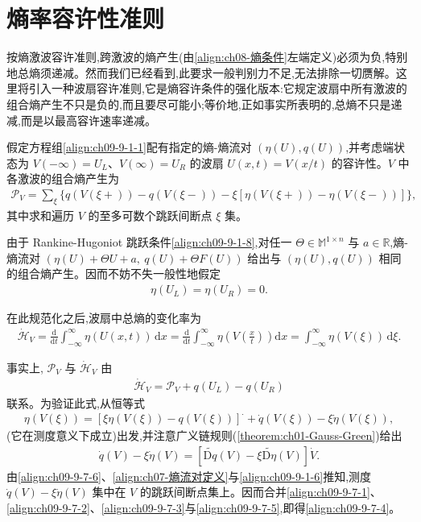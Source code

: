 \documentclass[../../main.tex]{subfiles}
\begin{document}
\section{熵率容许性准则}\label{section:ch09-熵率容许性准则}

按熵激波容许准则,跨激波的熵产生(由\eqref{align:ch08-熵条件}左端定义)必须为负,特别地总熵须递减。然而我们已经看到,此要求一般判别力不足,无法排除一切赝解。这里将引入一种波扇容许准则,它是熵容许条件的强化版本:它规定波扇中所有激波的组合熵产生不只是负的,而且要尽可能小;等价地,正如事实所表明的,总熵不只是递减,而是以最高容许速率递减。

假定方程组\eqref{align:ch09-9-1-1}配有指定的熵-熵流对 $(\eta(U),q(U))$,并考虑端状态为 $V(-\infty)=U_{L}$、$V(\infty)=U_{R}$ 的波扇 $U(x,t)=V(x/t)$ 的容许性。$V$ 中各激波的组合熵产生为
\begin{align}
\mathscr{P}_{V}=\sum_{\xi}\bigl\{q(V(\xi+))-q(V(\xi-))-\xi[\eta(V(\xi+))-\eta(V(\xi-))]\bigr\},
\label{align:ch09-9-7-1}
\end{align}
其中求和遍历 $V$ 的至多可数个跳跃间断点 $\xi$ 集。

由于 Rankine-Hugoniot 跳跃条件\eqref{align:ch09-9-1-8},对任一 $\Theta\in\mathbb{M}^{1\times n}$ 与 $a\in\mathbb{R}$,熵-熵流对 $(\eta(U)+\Theta U+a,\ q(U)+\Theta F(U))$ 给出与 $(\eta(U),q(U))$ 相同的组合熵产生。因而不妨不失一般性地假定
\begin{align}
\eta(U_{L})=\eta(U_{R})=0.
\label{align:ch09-9-7-2}
\end{align}

在此规范化之后,波扇中总熵的变化率为
\begin{align}
\dot{\mathscr{H}}_{V}=\frac{\mathrm{d}}{\mathrm{d}t}\int_{-\infty}^{\infty}\eta(U(x,t))\,\mathrm{d}x
=\frac{\mathrm{d}}{\mathrm{d}t}\int_{-\infty}^{\infty}\eta\!\left(V\!\left(\frac{x}{t}\right)\right)\mathrm{d}x
=\int_{-\infty}^{\infty}\eta(V(\xi))\,\mathrm{d}\xi.
\label{align:ch09-9-7-3}
\end{align}

事实上, $\mathscr{P}_{V}$ 与 $\dot{\mathscr{H}}_{V}$ 由
\begin{align}
\dot{\mathscr{H}}_{V}=\mathscr{P}_{V}+q(U_{L})-q(U_{R})
\label{align:ch09-9-7-4}
\end{align}
联系。为验证此式,从恒等式
\begin{align}
\eta(V(\xi))=[\xi\eta(V(\xi))-q(V(\xi))]^{\cdot}+\dot{q}(V(\xi))-\xi\dot{\eta}(V(\xi)),
\label{align:ch09-9-7-5}
\end{align}
(它在测度意义下成立)出发,并注意广义链规则(\cref{theorem:ch01-Gauss-Green})给出
\begin{align}
\dot{q}(V)-\xi\dot{\eta}(V)=[\widetilde{\mathrm{D}q}(V)-\xi\widetilde{\mathrm{D}\eta}(V)]\dot{V}.
\label{align:ch09-9-7-6}
\end{align}
由\eqref{align:ch09-9-7-6}、\eqref{align:ch07-熵流对定义}与\eqref{align:ch09-9-1-6}推知,测度 $\dot{q}(V)-\xi\dot{\eta}(V)$ 集中在 $V$ 的跳跃间断点集上。因而合并\eqref{align:ch09-9-7-1}、\eqref{align:ch09-9-7-2}、\eqref{align:ch09-9-7-3}与\eqref{align:ch09-9-7-5},即得\eqref{align:ch09-9-7-4}。
\end{document}
